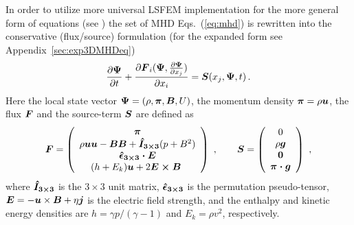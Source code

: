 In order to utilize more universal LSFEM implementation for the more general form of equations (see \citet{Lukin:2008}) the set of MHD
Eqs.~(\ref{eq:mhd}) is rewritten into the conservative (flux/source) formulation (for the expanded form see Appendix~\ref{sec:exp3DMHDeq})
\begin{equation}
\label{eq:MHDcons}
\frac{\partial \boldsymbol{\Psi}}{\partial t}
+\frac{\partial \boldsymbol{F}_i(\boldsymbol{\Psi},\frac{\partial \boldsymbol{\Psi}}{\partial x_j})}{\partial x_i}
=\boldsymbol{S}(x_j,\boldsymbol{\Psi},t)\,.
\end{equation}
Here the local state vector $\boldsymbol{\Psi} = (\rho,\boldsymbol{\pi},\boldsymbol{B},U)$, the momentum density $\boldsymbol{\pi}=\rho\boldsymbol{u}$, the flux $\boldsymbol{F}$ and the source-term
$\boldsymbol{S}$ are defined as
\begin{eqnarray}
\label{eq:MHDFluxSource}
  \boldsymbol{F}=\left(
  \begin{array}{c}
    \boldsymbol{\pi}\\
    \rho\boldsymbol{u}\boldsymbol{u}-\boldsymbol{B}\boldsymbol{B}
    +\boldsymbol{\hat{I}_{3\times3}}(p+B^2)\\
    \boldsymbol{\hat{\epsilon}_{3\times 3} \cdot E}\\
    (h+E_k)\boldsymbol{u}+2\boldsymbol{E\times B}\
  \end{array}
  \right) \ ,\qquad
  \boldsymbol{S}=\left(
  \begin{array}{c}
     0\\
     \rho\boldsymbol{g}\\
     \boldsymbol{0}\\
     \boldsymbol{\pi \cdot g}
  \end{array}
  \right) \ ,
\end{eqnarray}
where $\boldsymbol{\hat{I}_{3\times3}}$ is the $3\times 3$ unit matrix, $\boldsymbol{\hat{\epsilon}_{3\times 3}}$ is the permutation pseudo-tensor, $\boldsymbol{E}=-\boldsymbol{u}\times
\boldsymbol{B}+\eta\boldsymbol{j}$ is the electric field strength, and the enthalpy and kinetic energy densities are $h=\gamma p/(\gamma-1)$ and $E_k=\rho v^2$, 
respectively.